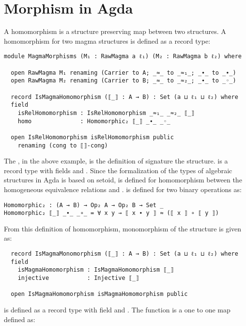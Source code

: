 \section{Morphism in Agda}
A homomorphism is a structure preserving map between two structures. A
homomorphism for two magma structures is defined as a record type:

\begin{verbatim}
module MagmaMorphisms (M₁ : RawMagma a ℓ₁) (M₂ : RawMagma b ℓ₂) where

  open RawMagma M₁ renaming (Carrier to A; _≈_ to _≈₁_; _∙_ to _∙_)
  open RawMagma M₂ renaming (Carrier to B; _≈_ to _≈₂_; _∙_ to _◦_)

  record IsMagmaHomomorphism (⟦_⟧ : A → B) : Set (a ⊔ ℓ₁ ⊔ ℓ₂) where
  field
    isRelHomomorphism : IsRelHomomorphism _≈₁_ _≈₂_ ⟦_⟧
    homo              : Homomorphic₂ ⟦_⟧ _∙_ _◦_

  open IsRelHomomorphism isRelHomomorphism public
    renaming (cong to ⟦⟧-cong)
\end{verbatim}

The , in the above example,  is the
definition of signature the structure.  is a record
type with fields  and . Since the
formalization of the types of algebraic structures in Agda is based on setoid,
 is defined for homomorphism between the homogeneous
equivalence relations  and .  is
defined for two binary operations as:

\begin{verbatim}
Homomorphic₂ : (A → B) → Op₂ A → Op₂ B → Set _
Homomorphic₂ ⟦_⟧ _∙_ _∘_ = ∀ x y → ⟦ x ∙ y ⟧ ≈ (⟦ x ⟧ ∘ ⟦ y ⟧)
\end{verbatim}

From this definition of homomorphism, monomorphism of the structure is given as:

\begin{verbatim}
  record IsMagmaMonomorphism (⟦_⟧ : A → B) : Set (a ⊔ ℓ₁ ⊔ ℓ₂) where
  field
    isMagmaHomomorphism : IsMagmaHomomorphism ⟦_⟧
    injective           : Injective ⟦_⟧

  open IsMagmaHomomorphism isMagmaHomomorphism public
\end{verbatim}

 is defined as a record type with field
 and . The 
function is a one to one map defined as:


